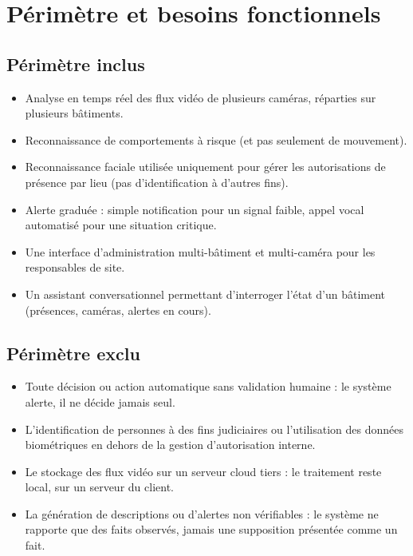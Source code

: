 \documentclass[11pt,a4paper]{article}
\begin{document}
\section{Périmètre et besoins fonctionnels}

\subsection{Périmètre inclus}
\begin{itemize}[leftmargin=1.4em, itemsep=2pt]
  \item Analyse en temps réel des flux vidéo de plusieurs caméras, réparties sur plusieurs bâtiments.
  \item Reconnaissance de comportements à risque (et pas seulement de mouvement).
  \item Reconnaissance faciale utilisée uniquement pour gérer les autorisations de présence par lieu (pas d'identification à d'autres fins).
  \item Alerte graduée : simple notification pour un signal faible, appel vocal automatisé pour une situation critique.
  \item Une interface d'administration multi-bâtiment et multi-caméra pour les responsables de site.
  \item Un assistant conversationnel permettant d'interroger l'état d'un bâtiment (présences, caméras, alertes en cours).
\end{itemize}

\subsection{Périmètre exclu}
\begin{itemize}[leftmargin=1.4em, itemsep=2pt]
  \item Toute décision ou action automatique sans validation humaine : le système alerte, il ne décide jamais seul.
  \item L'identification de personnes à des fins judiciaires ou l'utilisation des données biométriques en dehors de la gestion d'autorisation interne.
  \item Le stockage des flux vidéo sur un serveur cloud tiers : le traitement reste local, sur un serveur du client.
  \item La génération de descriptions ou d'alertes non vérifiables : le système ne rapporte que des faits observés, jamais une supposition présentée comme un fait.
\end{itemize}
\end{document}
